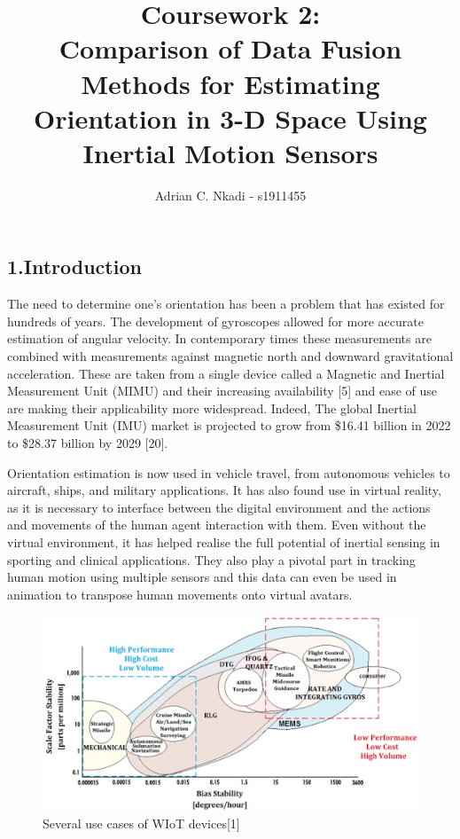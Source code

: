 \documentclass[10pt]{report}
\title{\textbf{\Huge Coursework 2: \protect\\Comparison of Data Fusion Methods for Estimating Orientation in 3-D Space Using Inertial Motion Sensors}}
\author{ \Large Adrian C. Nkadi - s1911455}
\date{}
\begin{document}
\maketitle
\subsection*{1.Introduction}
The need to determine one’s orientation has been a problem that has existed for hundreds of years. The development of gyroscopes allowed for more accurate estimation of angular velocity. In contemporary times these measurements are combined with measurements against magnetic north and downward gravitational acceleration. These are taken from a single device called a Magnetic and Inertial Measurement Unit (MIMU) and their increasing availability [5] and ease of use are making their applicability more widespread. Indeed, The global Inertial Measurement Unit (IMU) market is projected to grow from \$16.41 billion in 2022 to \$28.37 billion by 2029 [20].

Orientation estimation is now used in vehicle travel, from autonomous vehicles to aircraft, ships, and military applications. It has also found use in virtual reality, as it is necessary to interface between the digital environment and the actions and movements of the human agent interaction with them. Even without the virtual environment, it has helped realise the full potential of inertial sensing in sporting and clinical applications. They also play a pivotal part in tracking human motion using multiple sensors and this data can even be used in animation to transpose human movements onto virtual avatars. \newline
\begin{figure}[!h]
  \caption{Several use cases of WIoT devices[1]}
  \centering
  \label{fig:mimuprev}
  \includegraphics[]{mimuprevalance.png}
\end{figure}
\newline
\end{document}
